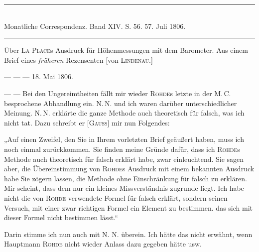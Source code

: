 \clearpage
{}
\hypertarget{native-490-lower}{}
\label{native-490-lower}
\begin{center}
\rule{0.55\linewidth}{0.4pt}\\[2pt]
Monatliche Correspondenz. Band XIV. S. 56. 57. Juli 1806.\\[2pt]
\rule{0.55\linewidth}{0.4pt}
\end{center}

\begin{center}
Über \textsc{La Place}s Ausdruck für Höhenmessungen mit dem Barometer. Aus einem Brief eines \emph{früheren} Rezensenten [von \textsc{Lindenau}.]
\end{center}

\begin{flushright}
--- --- --- 18. Mai 1806.
\end{flushright}

--- --- Bei den Ungereimtheiten fällt mir wieder \textsc{Rohde}s letzte in der M.\,C. besprochene Abhandlung ein. N.\,N. und ich waren darüber unterschiedlicher Meinung. N.\,N. erklärte die ganze Methode auch theoretisch für falsch, was ich nicht tat. Dazu schreibt er [\textsc{Gauss}] mir nun Folgendes:

„Auf einen Zweifel, den Sie in Ihrem vorletzten Brief geäußert haben, muss ich noch einmal zurückkommen. Sie finden meine Gründe dafür, dass ich \textsc{Rohde}s Methode auch theoretisch für falsch erklärt habe, zwar einleuchtend. Sie sagen aber, die Übereinstimmung von \textsc{Rohde}s Ausdruck mit einem bekannten Ausdruck habe Sie zögern lassen, die Methode ohne Einschränkung für falsch zu erklären.
Mir scheint, dass dem nur ein kleines Missverständnis zugrunde liegt. Ich habe nicht die von \textsc{Rohde} verwendete Formel für falsch erklärt, sondern seinen Versuch, mit einer zwar richtigen Formel ein Element zu bestimmen. das sich mit dieser Formel nicht bestimmen lässt.“

Darin stimme ich nun auch mit N. N. überein. Ich hätte das nicht erwähnt, wenn Hauptmann \textsc{Rohde} nicht wieder Anlass dazu gegeben hätte usw.

